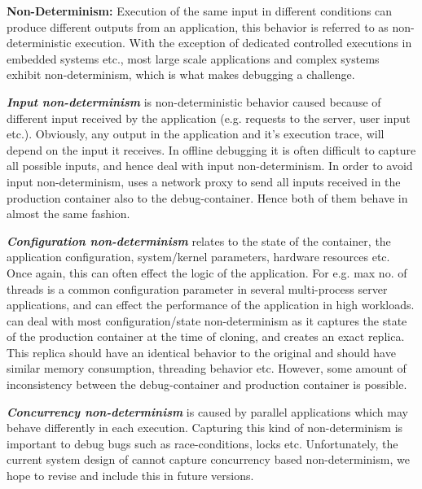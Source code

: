 \iffalse

\textbf{Non-Determinism: } 
Execution of the same input in different conditions can produce different outputs from an application, this behavior is referred to as non-deterministic execution.
With the exception of dedicated controlled executions in embedded systems etc., most large scale applications and complex systems exhibit non-determinism, which is what makes debugging a challenge.

\textbf{\textit{Input non-determinism}} is non-deterministic behavior caused because of different input received by the application (e.g. requests to the server, user input etc.). 
Obviously, any output in the application and it's execution trace, will depend on the input it receives. 
In offline debugging it is often difficult to capture all possible inputs, and hence deal with input non-determinism.
In order to avoid input non-determinism, \parikshan uses a network proxy to send all inputs received in the production container also to the debug-container. 
Hence both of them behave in almost the same fashion.

\textbf{\textit{Configuration non-determinism}} relates to the state of the container, the application configuration, system/kernel parameters, hardware resources etc.
Once again, this can often effect the logic of the application.
For e.g. max no. of threads is a common configuration parameter in several multi-process server applications, and can effect the performance of the application in high workloads.
\parikshan can deal with most configuration/state non-determinism as it captures the state of the production container at the time of cloning, and creates an exact replica.
This replica should have an identical behavior to the original and should have similar memory consumption, threading behavior etc. 
However, some amount of inconsistency between the debug-container and production container is possible.

\textbf{\textit{Concurrency non-determinism}} is caused by parallel applications which may behave differently in each execution.
Capturing this kind of non-determinism is important to debug bugs such as race-conditions, locks etc.
Unfortunately, the current system design of \parikshan cannot capture concurrency based non-determinism, we hope to revise and include this in future versions.

